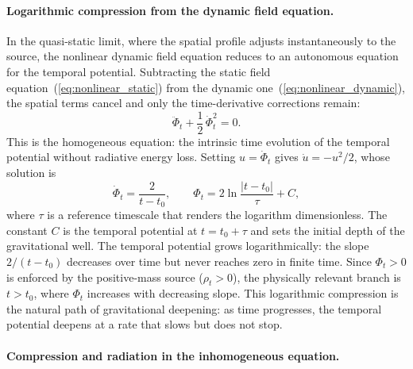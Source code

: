 \documentclass[12pt]{article}
\begin{document}
\paragraph{Logarithmic compression from the dynamic field equation.}
In the quasi-static limit, where the spatial profile adjusts instantaneously to the source, the nonlinear dynamic field equation reduces to an autonomous equation for the temporal potential. Subtracting the static field equation~(\ref{eq:nonlinear_static}) from the dynamic one~(\ref{eq:nonlinear_dynamic}), the spatial terms cancel and only the time-derivative corrections remain:
\begin{equation}
\ddot{\Phi}_t + \frac{1}{2}\,\dot{\Phi}_t^2 = 0.
\label{eq:auto_ode}
\end{equation}
This is the homogeneous equation: the intrinsic time evolution of the temporal potential without radiative energy loss. Setting $u = \dot{\Phi}_t$ gives $\dot{u} = -u^2/2$, whose solution is
\begin{equation}
\dot{\Phi}_t = \frac{2}{t - t_0}, \qquad \Phi_t = 2\ln\frac{|t - t_0|}{\tau} + C,
\label{eq:log_solution}
\end{equation}
where $\tau$ is a reference timescale that renders the logarithm dimensionless. The constant $C$ is the temporal potential at $t = t_0 + \tau$ and sets the initial depth of the gravitational well. The temporal potential grows logarithmically: the slope $2/(t - t_0)$ decreases over time but never reaches zero in finite time. Since $\Phi_t > 0$ is enforced by the positive-mass source ($\rho_t > 0$), the physically relevant branch is $t > t_0$, where $\Phi_t$ increases with decreasing slope. This logarithmic compression is the natural path of gravitational deepening: as time progresses, the temporal potential deepens at a rate that slows but does not stop.

\paragraph{Compression and radiation in the inhomogeneous equation.}
\end{document}
